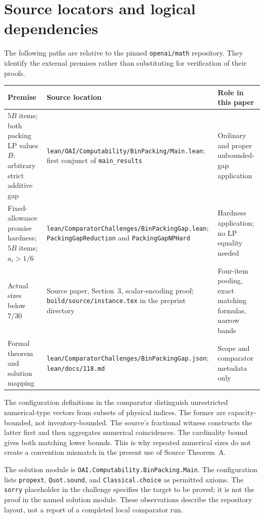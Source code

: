 \documentclass[11pt,a4paper]{article}
\theoremstyle{definition}
\theoremstyle{remark}
\begin{document}
\section{Source locators and logical dependencies}\label{app:source}
The following paths are relative to the pinned \texttt{openai/math} repository. They identify the external premises rather than substituting for verification of their proofs.
\begin{center}
\small
\begin{tabular}{@{}>{\raggedright\arraybackslash}p{}>{\raggedright\arraybackslash}p{}>{\raggedright\arraybackslash}p{}@{}}
\toprule
Premise & Source location & Role in this paper\\
\midrule
$5B$ items; both packing LP values $B$; arbitrary strict additive gap &
\texttt{lean/OAI/Computability/}\newline\texttt{BinPacking/Main.lean}; first conjunct of \texttt{main\_results} &
Ordinary and proper unbounded-gap application\\[5pt]
Fixed-allowance promise hardness; $5B$ items; $a_i>1/6$ &
\texttt{lean/ComparatorChallenges/}\newline\texttt{BinPackingGap.lean}; \texttt{PackingGapReduction} and \texttt{PackingGapNPHard} &
Hardness application; no LP equality needed\\[5pt]
Actual sizes below $7/30$ &
Source paper, Section~3, scalar-encoding proof; \nolinkurl{build/source/instance.tex} in the preprint directory &
Four-item pooling, exact matching formulas, narrow bands\\[5pt]
Formal theorem and solution mapping &
\texttt{lean/ComparatorChallenges/}\newline\texttt{BinPackingGap.json}; \nolinkurl{lean/docs/118.md} &
Scope and comparator metadata only\\
\bottomrule
\end{tabular}
\end{center}
The configuration definitions in the comparator distinguish unrestricted numerical-type vectors from subsets of physical indices. The former are capacity-bounded, not inventory-bounded. The source's fractional witness constructs the latter first and then aggregates numerical coincidences. The cardinality bound gives both matching lower bounds. This is why repeated numerical sizes do not create a convention mismatch in the present use of Source Theorem~A.

The solution module is \texttt{OAI.Computability.BinPacking.Main}. The configuration lists \texttt{propext}, \texttt{Quot.sound}, and \texttt{Classical.choice} as permitted axioms. The \texttt{sorry} placeholder in the challenge specifies the target to be proved; it is not the proof in the named solution module. These observations describe the repository layout, not a report of a completed local comparator run.
\end{document}
